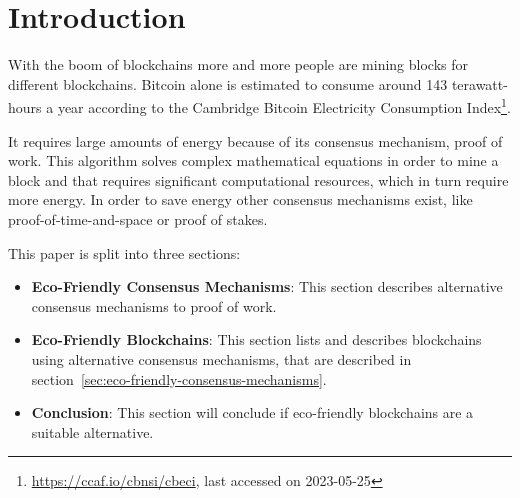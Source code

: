 
\section{Introduction}\label{sec:introduction}
With the boom of blockchains more and more people are mining blocks for different blockchains.
Bitcoin alone is estimated to consume around 143 terawatt-hours a year according to the Cambridge Bitcoin Electricity Consumption Index\footnote{\url{https://ccaf.io/cbnsi/cbeci}, last accessed on 2023-05-25}.

It requires large amounts of energy because of its consensus mechanism, proof of work.\cite{why-does-bitcoin-use-so-much-energy}
This algorithm solves complex mathematical equations in order to mine a block and that requires significant computational resources, which in turn require more energy.
In order to save energy other consensus mechanisms exist, like proof-of-time-and-space or proof of stakes.

This paper is split into three sections:
\begin{itemize}
    \item\textbf{Eco-Friendly Consensus Mechanisms}: This section describes alternative consensus mechanisms to proof of work.
    \item\textbf{Eco-Friendly Blockchains}: This section lists and describes blockchains using alternative consensus mechanisms, that are described in section\ \ref{sec:eco-friendly-consensus-mechanisms}.
    \item\textbf{Conclusion}: This section will conclude if eco-friendly blockchains are a suitable alternative.
\end{itemize}
